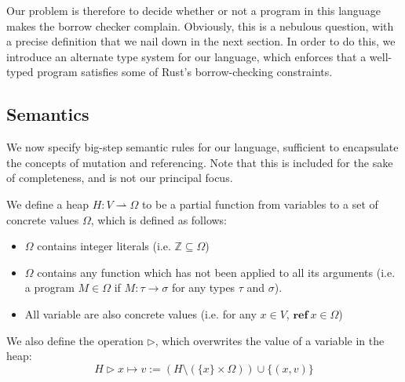 \documentclass{article}
\newcommand{\mkref}{\textbf{ref}~}
\newcommand{\parfun}{\rightharpoonup}
\newcommand{\overwrite}{\triangleright}
\begin{document}
Our problem is therefore to decide whether or not a program in this language makes the borrow checker complain. Obviously, this is a nebulous question, with a precise definition that we nail down in the next section. In order to do this, we introduce an alternate type system for our language, which enforces that a well-typed program satisfies some of Rust's borrow-checking constraints.


\subsection{Semantics}

We now specify big-step semantic rules for our language, sufficient to encapsulate the concepts of mutation and referencing. Note that this is included for the sake of completeness, and is not our principal focus.

We define a heap $H : V \parfun \Omega$ to be a partial function from variables to a set of concrete values $\Omega$, which is defined as follows: 
\begin{itemize}
    \item $\Omega$ contains integer literals (i.e. $\mathbb{Z} \subseteq \Omega$)
    \item $\Omega$ contains any function which has not been applied to all its arguments (i.e. a program $M \in \Omega$ if $M : \tau \rightarrow \sigma$ for any types $\tau$ and $\sigma$).
    \item All variable are also concrete values (i.e. for any  $x \in V$, $\mkref x \in \Omega$) %
\end{itemize}
We also define the operation $\overwrite$, which overwrites the value of a variable in the heap: 
\begin{equation*}
    H \overwrite x \mapsto v := (H \setminus (\{x\} \times \Omega) ) \cup \{(x, v)\} 
\end{equation*}
\end{document}
